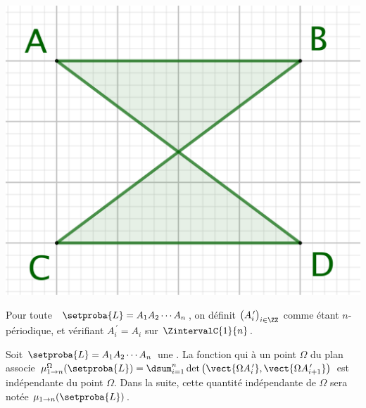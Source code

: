 \begin{center}
    \includegraphics[scale=.4]{content/polygon/sufficient-cond/anti-para.png}
\end{center}




\begin{defi} \label{garea-pt-ct}
    Pour toute \nline\  $\setproba{L} = A_1 A_2 \cdots A_n$, on définit $\big( A^{\,\prime}_i \big)_{i \in \ZZ}$ comme étant $n$-périodique, et vérifiant $A^{\,\prime}_{i} = A_i$ sur $\ZintervalC{1}{n}$.
\end{defi}




\begin{fact} \label{garea-pt-ct}
    Soit $\setproba{L} = A_1 A_2 \cdots A_n$ une \nline.
    La fonction qui à un point $\Omega$ du plan associe 
    $\mu_{1 \to n}^\Omega (\setproba{L}) = \dsum_{i=1}^{n} \det \big( \vect{\Omega A^{\,\prime}_i} , \vect{\Omega A^{\,\prime}_{i+1}} \big)$ est indépendante du point $\Omega$.
    Dans la suite, cette quantité indépendante de $\Omega$ sera notée $\mu_{1 \to n} (\setproba{L})$.
\end{fact}



